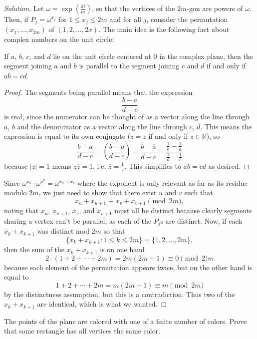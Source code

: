 \documentclass[11pt]{scrartcl}
\providecommand{\ol}{\overline}
\providecommand{\RR}{\mathbb R}
\newenvironment{soln}{\begin{proof}[Solution]}{\end{proof}}
\begin{document}
\begin{soln}
	Let $\omega = \exp(\frac{\pi i}{m})$, so that the vertices of the
	$2m$-gon are powers of $\omega$. Then, if $P_j = \omega^{x_j}$
	for $1\le x_j\le 2m$ and for all $j$,
	consider the permutation $(x_1, \dots, x_{2m})$ of $(1, 2, \dots, 2x)$.
	The main idea is the following fact
	about complex numbers on the unit circle:
	\begin{claim}
		If $a$, $b$, $c$, and $d$ lie on the unit circle centered at $0$
		in the complex plane,
		then the segment joining $a$ and $b$ is parallel to
		the segment joining $c$ and $d$ if and only if $ab = cd$.
	\end{claim}
	\begin{proof}
		The segments being parallel means that the expression
		\[\frac{b - a}{d - c}\]
		is real, since the numerator can be thought of as
		a vector along the line through $a$, $b$ and the denominator as
		a vector along the line through $c$, $d$.
		This means the expression is equal to its own conjugate
		($z = \ol z$ if and only if $z\in\RR$), so
		\[\frac{b-a}{d-c} = \ol{\left(\frac{b-a}{d-c}\right)}
		= \frac{\ol b-\ol a}{\ol d- \ol c}
		= \frac{\frac1b - \frac1a}{\frac 1d - \frac 1c}\]
		because $|z| = 1$ means $z\ol z = 1$, i.e. $\ol z = \frac 1z$.
		This simplifies to $ab = cd$ as desired.
	\end{proof}
	Since $\omega^{x_a}\cdot \omega^{x^b} = \omega^{x_a + x_b}$
	where the exponent is only relevant as far as its residue modulo $2m$,
	we just need to show that there exist $u$ and $v$ such that
	\[x_u + x_{u+1}\equiv x_v + x_{v+1}\pmod{2m},\]
	noting that $x_u$, $x_{u+1}$, $x_{v}$, and $x_{v+1}$ must all be distinct
	because clearly segments sharing a vertex can't be parallel,
	as each of the $P_j$s are distinct.
	Now, if each $x_k + x_{k+1}$ was distinct mod $2m$ so that
	\[\{x_k + x_{k+1} : 1\le k\le 2m\} = \{1, 2, \dots, 2m\},\]
	then the sum of the $x_k + x_{k+1}$ is on one hand
	\[2\cdot(1 + 2 + \cdots + 2m) = 2m(2m + 1)\equiv 0\pmod 2m\]
	because each element of the permutation appears twice,
	but on the other hand is equal to
	\[1 + 2 + \cdots + 2m = m(2m + 1)\equiv m\pmod{2m}\]
	by the distinctness assumption, but this is a contradiction.
	Thus two of the $x_k + x_{k+1}$ are identical,
	which is what we wanted.
\end{soln}

\begin{problem}
	The points of the plane are colored with one of a finite number of colors.
	Prove that some rectangle has all vertices the same color.
\end{problem}
\end{document}
